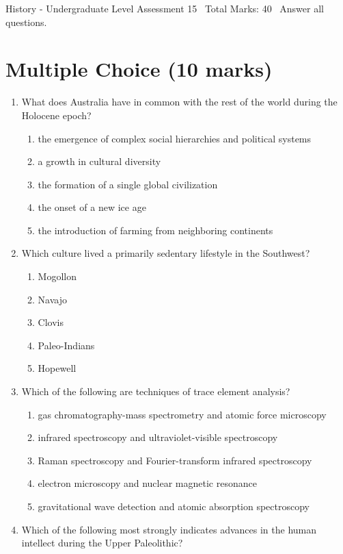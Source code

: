 \documentclass[12pt]{article}
\begin{document}
\begin{center}
History - Undergraduate Level Assessment 15 \
Total Marks: 40 \
Answer all questions.
\end{center}

\section*{Multiple Choice (10 marks)}
\begin{enumerate}[label=\arabic*.]
\item What does Australia have in common with the rest of the world during the Holocene epoch?
\begin{enumerate}[label=(\alph*)]
    \item the emergence of complex social hierarchies and political systems
    \item a growth in cultural diversity
    \item the formation of a single global civilization
    \item the onset of a new ice age
    \item the introduction of farming from neighboring continents
\end{enumerate}
\item Which culture lived a primarily sedentary lifestyle in the Southwest?
\begin{enumerate}[label=(\alph*)]
    \item Mogollon
    \item Navajo
    \item Clovis
    \item Paleo-Indians
    \item Hopewell
\end{enumerate}
\item Which of the following are techniques of trace element analysis?
\begin{enumerate}[label=(\alph*)]
    \item gas chromatography-mass spectrometry and atomic force microscopy
    \item infrared spectroscopy and ultraviolet-visible spectroscopy
    \item Raman spectroscopy and Fourier-transform infrared spectroscopy
    \item electron microscopy and nuclear magnetic resonance
    \item gravitational wave detection and atomic absorption spectroscopy
\end{enumerate}
\item Which of the following most strongly indicates advances in the human intellect during the Upper Paleolithic?

\end{enumerate}
\end{document}
